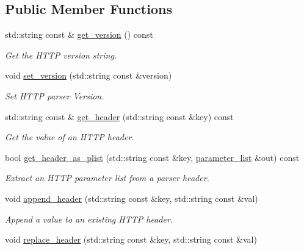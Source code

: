 \subsection*{Public Member Functions}
\begin{DoxyCompactItemize}
\item 
std\+::string const  \& \mbox{\hyperlink{classwebsocketpp_1_1http_1_1parser_1_1parser_a6dbb56d657bca4ee492f3b07a579c341}{get\+\_\+version}} () const
\begin{DoxyCompactList}\small\item\em Get the H\+T\+TP version string. \end{DoxyCompactList}\item 
void \mbox{\hyperlink{classwebsocketpp_1_1http_1_1parser_1_1parser_a5c2e0e2bc0b2769db5a785b7d47a66ee}{set\+\_\+version}} (std\+::string const \&version)
\begin{DoxyCompactList}\small\item\em Set H\+T\+TP parser Version. \end{DoxyCompactList}\item 
std\+::string const  \& \mbox{\hyperlink{classwebsocketpp_1_1http_1_1parser_1_1parser_ae8a8f833c3fb01f1553a26e77f380367}{get\+\_\+header}} (std\+::string const \&key) const
\begin{DoxyCompactList}\small\item\em Get the value of an H\+T\+TP header. \end{DoxyCompactList}\item 
bool \mbox{\hyperlink{classwebsocketpp_1_1http_1_1parser_1_1parser_a42ab85c14bef2028d1e6f050af1140ce}{get\+\_\+header\+\_\+as\+\_\+plist}} (std\+::string const \&key, \mbox{\hyperlink{namespacewebsocketpp_1_1http_a2c285bc959df5a63bf962bed842fccfb}{parameter\+\_\+list}} \&out) const
\begin{DoxyCompactList}\small\item\em Extract an H\+T\+TP parameter list from a parser header. \end{DoxyCompactList}\item 
void \mbox{\hyperlink{classwebsocketpp_1_1http_1_1parser_1_1parser_abd39762de5ec467a29a537d79602b603}{append\+\_\+header}} (std\+::string const \&key, std\+::string const \&val)
\begin{DoxyCompactList}\small\item\em Append a value to an existing H\+T\+TP header. \end{DoxyCompactList}\item 
void \mbox{\hyperlink{classwebsocketpp_1_1http_1_1parser_1_1parser_aba2991b2aa41ca60d9427950502b0b93}{replace\+\_\+header}} (std\+::string const \&key, std\+::string const \&val)

\end{DoxyCompactItemize}
